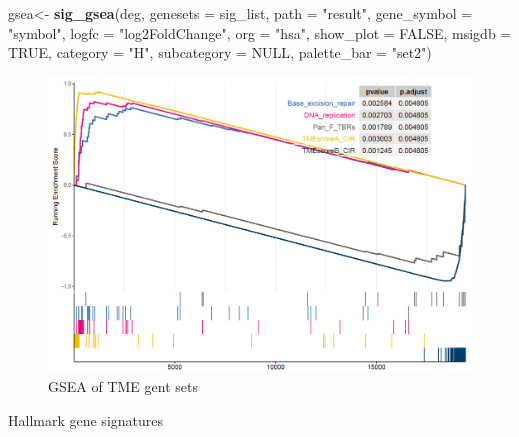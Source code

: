 \documentclass[
  12pt,
]{book}
\newenvironment{Shaded}{\begin{snugshade}}{\end{snugshade}}
\newcommand{\AttributeTok}[1]{\textcolor[rgb]{0.13,0.29,0.53}{#1}}
\newcommand{\ConstantTok}[1]{\textcolor[rgb]{0.56,0.35,0.01}{#1}}
\newcommand{\FunctionTok}[1]{\textcolor[rgb]{0.13,0.29,0.53}{\textbf{#1}}}
\newcommand{\NormalTok}[1]{#1}
\newcommand{\OtherTok}[1]{\textcolor[rgb]{0.56,0.35,0.01}{#1}}
\newcommand{\StringTok}[1]{\textcolor[rgb]{0.31,0.60,0.02}{#1}}
\begin{document}
\begin{Shaded}
\begin{Highlighting}[]
\NormalTok{gsea}\OtherTok{\textless{}{-}}     \FunctionTok{sig\_gsea}\NormalTok{(deg,}
                    \AttributeTok{genesets          =}\NormalTok{ sig\_list,}
                    \AttributeTok{path              =} \StringTok{"result"}\NormalTok{,}
                    \AttributeTok{gene\_symbol       =} \StringTok{"symbol"}\NormalTok{,}
                    \AttributeTok{logfc             =} \StringTok{"log2FoldChange"}\NormalTok{,}
                    \AttributeTok{org               =} \StringTok{"hsa"}\NormalTok{,}
                    \AttributeTok{show\_plot         =} \ConstantTok{FALSE}\NormalTok{,}
                    \AttributeTok{msigdb            =} \ConstantTok{TRUE}\NormalTok{,}
                    \AttributeTok{category          =} \StringTok{"H"}\NormalTok{,}
                    \AttributeTok{subcategory       =} \ConstantTok{NULL}\NormalTok{,}
                    \AttributeTok{palette\_bar       =} \StringTok{"set2"}\NormalTok{)}
\end{Highlighting}
\end{Shaded}

\begin{figure}

{\centering \includegraphics[width=0.95\linewidth]{./fig/gsea-1} 

}

\caption{GSEA of TME gent sets}\label{fig:unnamed-chunk-9}
\end{figure}

Hallmark gene signatures
\end{document}
